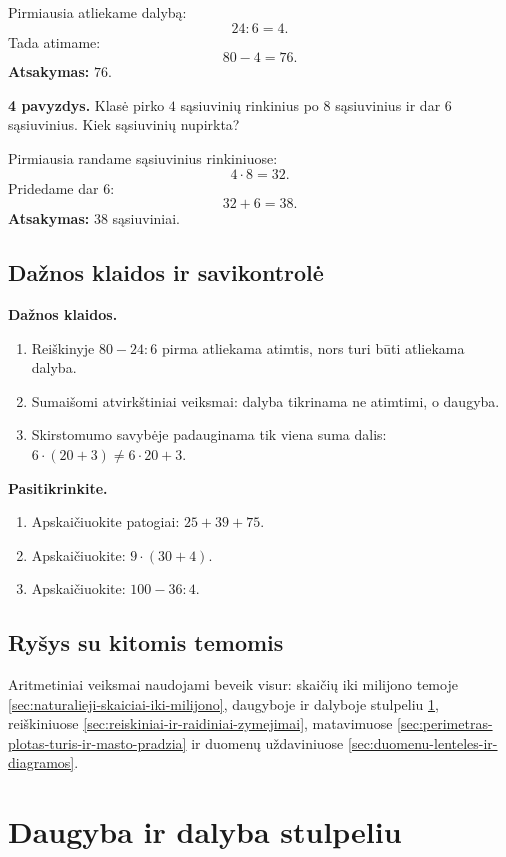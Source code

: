 Pirmiausia atliekame dalybą:
\[
24:6=4.
\]
Tada atimame:
\[
80-4=76.
\]
\textbf{Atsakymas:} \(76\).

\textbf{4 pavyzdys.} Klasė pirko \(4\) sąsiuvinių rinkinius po \(8\) sąsiuvinius ir dar \(6\) sąsiuvinius. Kiek sąsiuvinių nupirkta?

Pirmiausia randame sąsiuvinius rinkiniuose:
\[
4\cdot8=32.
\]
Pridedame dar \(6\):
\[
32+6=38.
\]
\textbf{Atsakymas:} \(38\) sąsiuviniai.

\subsection{Dažnos klaidos ir savikontrolė}

\textbf{Dažnos klaidos.}
\begin{enumerate}[label=\arabic*.]
\item Reiškinyje \(80-24:6\) pirma atliekama atimtis, nors turi būti atliekama dalyba.
\item Sumaišomi atvirkštiniai veiksmai: dalyba tikrinama ne atimtimi, o daugyba.
\item Skirstomumo savybėje padauginama tik viena suma dalis: \(6\cdot(20+3)\neq 6\cdot20+3\).
\end{enumerate}

\textbf{Pasitikrinkite.}
\begin{enumerate}[label=\arabic*.]
\item Apskaičiuokite patogiai: \(25+39+75\).
\item Apskaičiuokite: \(9\cdot(30+4)\).
\item Apskaičiuokite: \(100-36:4\).
\end{enumerate}

\subsection{Ryšys su kitomis temomis}

Aritmetiniai veiksmai naudojami beveik visur: skaičių iki milijono temoje \ref{sec:naturalieji-skaiciai-iki-milijono}, daugyboje ir dalyboje stulpeliu \ref{sec:daugyba-ir-dalyba-stulpeliu}, reiškiniuose \ref{sec:reiskiniai-ir-raidiniai-zymejimai}, matavimuose \ref{sec:perimetras-plotas-turis-ir-masto-pradzia} ir duomenų uždaviniuose \ref{sec:duomenu-lenteles-ir-diagramos}.

\section{Daugyba ir dalyba stulpeliu}\label{sec:daugyba-ir-dalyba-stulpeliu}


